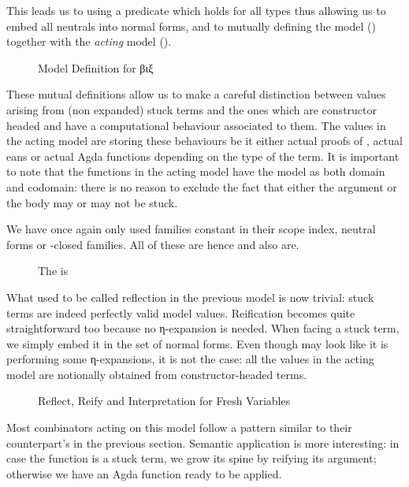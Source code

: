 This leads us to using a predicate  which holds for all types thus allowing
us to embed all neutrals into normal forms, and to  mutually defining the model
() together with the \emph{acting} model ().

\begin{figure}[h]
\caption{Model Definition for βιξ\label{nbestuckmodel}}
\end{figure}

These mutual definitions allow us to make a careful distinction between values
arising from (non expanded) stuck terms and the ones which are constructor headed
and have a computational behaviour associated to them. The values in the acting
model are storing these behaviours be it either actual proofs of , actual
eans or actual Agda functions depending on the type of the term. It is
important to note that the functions in the acting model have the model as both
domain and codomain: there is no reason to exclude the fact that either the argument
or the body may or may not be stuck.

We have once again only used families constant in their scope index, neutral forms or
-closed families. All of these are  hence  and 
also are.

\begin{figure}[h]
\caption{The  is }
\end{figure}

What used to be called reflection in the previous model is now trivial:
stuck terms are indeed perfectly valid model values. Reification becomes
quite straightforward too because no η-expansion is needed. When facing
a stuck term, we simply embed it in the set of normal forms. Even though
 may look like it is performing some η-expansions, it is not
the case: all the values in the acting model are notionally obtained
from constructor-headed terms.

\begin{figure}[h]
\caption{Reflect, Reify and Interpretation for Fresh Variables}
\end{figure}

Most combinators acting on this model follow a pattern similar to their
counterpart's in the previous section. Semantic application is
more interesting: in case the function is a stuck term, we grow its
spine by reifying its argument; otherwise we have an Agda function ready
to be applied.

